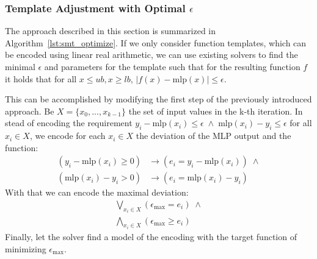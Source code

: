     \subsubsection{Template Adjustment with Optimal $\epsilon$}
    \label{subsubsec:smt2}
        \begin{tcolorbox}[arc=0mm, colback=rwthlightgray, outer arc=0mm, colframe = white, size=small, bottom=-9mm]
            
        \end{tcolorbox}
        \vspace{9mm}
        The approach described in this section is summarized in Algorithm~\ref{lst:smt_optimize}. If we only consider function templates, which can be encoded using linear real arithmetic, we can use existing solvers \cite{DBLP:conf/tacas/BjornerPF15} to find the minimal $\epsilon$ and parameters for the template such that for the resulting function $f$ it holds that for all $x \leq ub, x \geq lb$, $|f(x) - \text{mlp}(x)| \leq \epsilon$.\par
        This can be accomplished by modifying the first step of the previously introduced approach.
        Be $X= \{x_0, ..., x_{k-1} \}$ the set of input values in the k-th iteration.
        In stead of encoding the requirement $y_i-\text{mlp}(x_i) \leq \epsilon\; \land\; \text{mlp}(x_i)-y_i \leq \epsilon$ for all $x_i \in X$,
        we encode for each $x_i \in X$ the deviation of the MLP output and the function:
        \begin{align*}
            (y_i - \text{mlp}(x_i) \geq 0) &\rightarrow (e_i = y_i - \text{mlp}(x_i) )\; \land \\
            (\text{mlp}(x_i) - y_i > 0) &\rightarrow (e_i = \text{mlp}(x_i) - y_i)
        \end{align*}
        With that we can encode the maximal deviation:
        \begin{align*}
            \bigvee_{x_i \in X} ( \epsilon_{\text{max}} = e_i )\; \land \\
            \bigwedge_{x_i \in X} ( \epsilon_{\text{max}} \geq e_i)
        \end{align*}
        Finally, let the solver find a model of the encoding with the target function of minimizing $\epsilon_{\text{max}}$.


